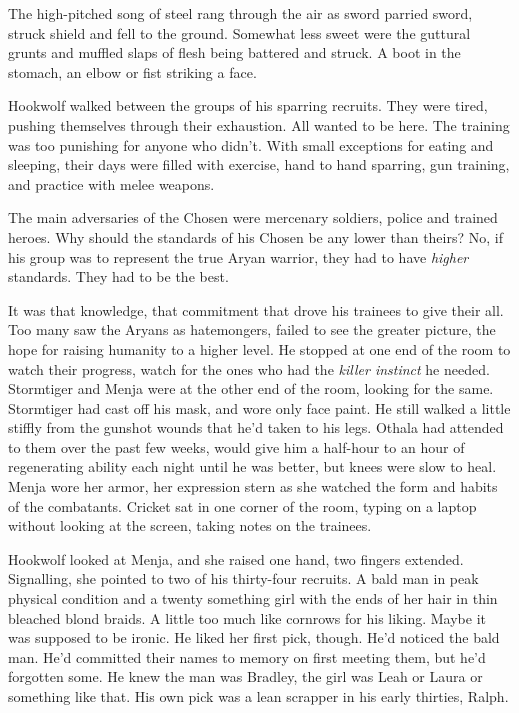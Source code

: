 





The high-pitched song of steel rang through the air as sword parried sword, struck shield and fell to the ground.  Somewhat less sweet were the guttural grunts and muffled slaps of flesh being battered and struck.  A boot in the stomach, an elbow or fist striking a face.



Hookwolf walked between the groups of his sparring recruits.  They were tired, pushing themselves through their exhaustion.  All wanted to be here.  The training was too punishing for anyone who didn't.  With small exceptions for eating and sleeping, their days were filled with exercise, hand to hand sparring, gun training, and practice with melee weapons.



The main adversaries of the Chosen were mercenary soldiers, police and trained heroes.  Why should the standards of his Chosen be any lower than theirs?  No, if his group was to represent the true Aryan warrior, they had to have \emph{higher} standards.  They had to be the best.



It was that knowledge, that commitment that drove his trainees to give their all.  Too many saw the Aryans as hatemongers, failed to see the greater picture, the hope for raising humanity to a higher level.  He stopped at one end of the room to watch their progress, watch for the ones who had the \emph{killer instinct} he needed.  Stormtiger and Menja were at the other end of the room, looking for the same.  Stormtiger had cast off his mask, and wore only face paint.  He still walked a little stiffly from the gunshot wounds that he'd taken to his legs.  Othala had attended to them over the past few weeks, would give him a half-hour to an hour of regenerating ability each night until he was better, but knees were slow to heal.  Menja wore her armor, her expression stern as she watched the form and habits of the combatants.  Cricket sat in one corner of the room, typing on a laptop without looking at the screen, taking notes on the trainees.



Hookwolf looked at Menja, and she raised one hand, two fingers extended.  Signalling, she pointed to two of his thirty-four recruits.  A bald man in peak physical condition and a twenty something girl with the ends of her hair in thin bleached blond braids.  A little too much like cornrows for his liking.  Maybe it was supposed to be ironic.  He liked her first pick, though.  He'd noticed the bald man.  He'd committed their names to memory on first meeting them, but he'd forgotten some.  He knew the man was Bradley, the girl was Leah or Laura or something like that.  His own pick was a lean scrapper in his early thirties, Ralph.



